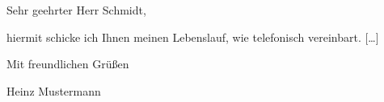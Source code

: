 \documentclass{facsimile}
\begin{document}
\makefaxtitle

\opening{Sehr geehrter Herr Schmidt,}
hiermit schicke ich Ihnen meinen Lebenslauf, wie telefonisch
vereinbart.
[\dots]

Mit freundlichen Grüßen

Heinz Mustermann

\end{document}
